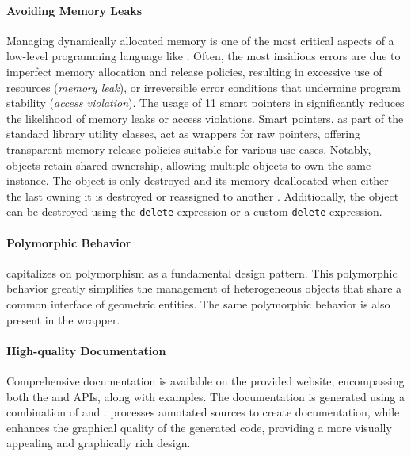 \paragraph{Avoiding Memory Leaks}
Managing dynamically allocated memory is one of the most critical aspects of a low-level programming language like \cpp{}. Often, the most insidious errors are due to imperfect memory allocation and release policies, resulting in excessive use of resources (\emph{memory leak}), or irreversible error conditions that undermine program stability (\emph{access violation}). The usage of \cpp{}11 smart pointers in \Acme{} significantly reduces the likelihood of memory leaks or access violations. Smart pointers, as part of the standard library utility classes, act as wrappers for raw pointers, offering transparent memory release policies suitable for various use cases. Notably, \SharedPointer{} objects retain shared ownership, allowing multiple objects to own the same instance. The object is only destroyed and its memory deallocated when either the last \SharedPointer{} owning it is destroyed or reassigned to another \SharedPointer{}. Additionally, the object can be destroyed using the \texttt{delete} expression or a custom \texttt{delete} expression.

\paragraph{Polymorphic Behavior}
\Acme{} capitalizes on \cpp{} polymorphism as a fundamental design pattern. This polymorphic behavior greatly simplifies the management of heterogeneous objects that share a common interface of geometric entities. The same \cpp{} polymorphic behavior is also present in the \Matlab{} \Mex{} wrapper.

\paragraph{High-quality Documentation}
Comprehensive documentation is available on the provided website, encompassing both the \cpp{} and \Matlab{} \Mex{} \acp{API}, along with examples. The documentation is generated using a combination of \Doxygen{} and \Sphinx{}. \Doxygen{} processes annotated \cpp{} sources to create documentation, while \Sphinx{} enhances the graphical quality of the generated \html{} code, providing a more visually appealing and graphically rich design.

